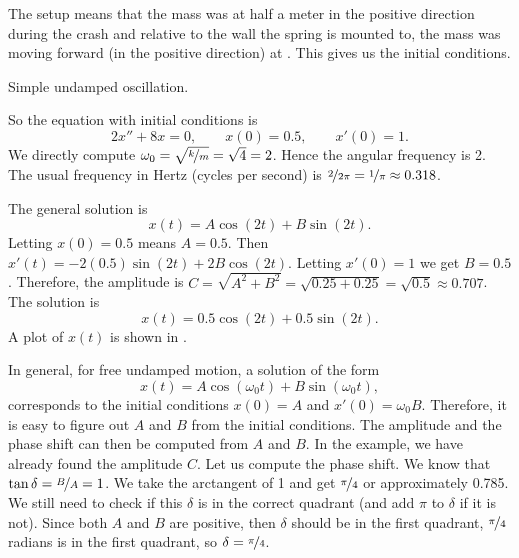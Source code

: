 \begin{exampleSol}
The setup means that the mass was at half a meter in the positive
direction during the crash and
relative to the wall the spring is mounted to, the mass was moving forward
(in the positive direction) at .  This gives us the initial
conditions.

\begin{mywrapfig}[15]{3.25in}
\capstart
{}
\caption{Simple undamped oscillation.\label{mv:undampedfig}}
\end{mywrapfig}

So the equation with initial conditions is
\begin{equation*}
2 x'' + 8 x = 0 , \qquad x(0) = 0.5, \qquad x'(0) = 1.
\end{equation*}
We directly compute $\omega_0 = \sqrt{\nicefrac{k}{m}} = \sqrt{4} = 2$.
Hence the angular frequency is 2.  The usual frequency in Hertz (cycles per
second) is $\nicefrac{2}{2\pi} = \nicefrac{1}{\pi} \approx 0.318$.

The general solution is
\begin{equation*}
x(t) = A \cos (2t) + B \sin (2t) .
\end{equation*}
Letting $x(0) = 0.5$ means $A = 0.5$.  Then $x'(t) = - 2(0.5) \sin (2t)
+ 2B \cos (2t)$.
Letting $x'(0) = 1$ we get $B = 0.5$.  Therefore, the amplitude is
$C = \sqrt{A^2+B^2} = \sqrt{0.25+0.25} = \sqrt{0.5} \approx 0.707$.  The solution is
\begin{equation*}
x(t) = 0.5 \cos (2t) + 0.5 \sin (2t) .
\end{equation*}
A plot of $x(t)$ is shown in .
\end{exampleSol}

In general, for free undamped motion, a solution of the
form
\begin{equation*}
x(t) = A \cos (\omega_0 t) + B \sin (\omega_0 t) ,
\end{equation*}
corresponds to the initial conditions $x(0) = A$ and $x'(0) = \omega_0 B$.
Therefore, it is easy to figure out $A$ and $B$ from the initial
conditions. 
The amplitude and the phase shift can then be computed from $A$ and $B$.
In the example, we have already found the amplitude $C$.  Let us
compute the phase shift.  We know that $\tan \delta = \nicefrac{B}{A} = 1$.  We take the
arctangent of 1 and get $\nicefrac{\pi}{4}$ or approximately 0.785.
We still need to check if this $\delta$ is in the correct quadrant
(and add $\pi$ to $\delta$ if it is not).
Since both $A$ and $B$ are positive, then $\delta$ should be in the first
quadrant, $\nicefrac{\pi}{4}$ radians is in the first quadrant, so $\delta =
\nicefrac{\pi}{4}$.

